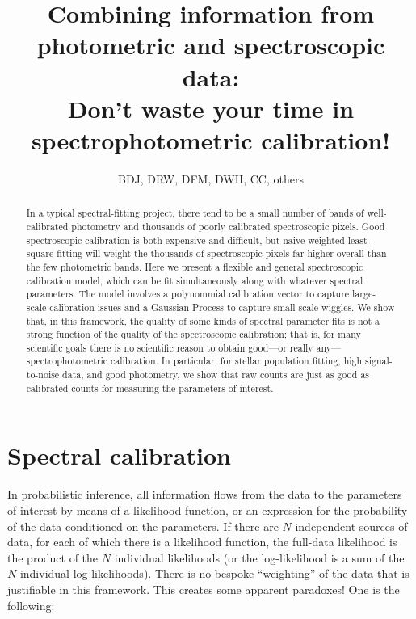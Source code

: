 \documentclass[12pt, letterpaper, preprint]{aastex}
\begin{document}
\title{Combining information from photometric and spectroscopic data:\\
  Don't waste your time in spectrophotometric calibration!}
\author{BDJ, DRW, DFM, DWH, CC, others}

\begin{abstract}
In a typical spectral-fitting project,
  there tend to be a small number of bands of well-calibrated photometry
  and thousands of poorly calibrated spectroscopic pixels.
Good spectroscopic calibration is both expensive and difficult,
  but naive weighted least-square fitting will weight
  the thousands of spectroscopic pixels far higher overall
  than the few photometric bands.
Here we present a flexible and general spectroscopic calibration model,
  which can be fit simultaneously along with whatever spectral parameters.
The model involves a polynommial calibration vector to capture large-scale calibration issues
  and a Gaussian Process to capture small-scale wiggles.
We show that, in this framework, the quality of some kinds of spectral parameter fits
  is not a strong function of the quality of the spectroscopic calibration;
  that is, for many scientific goals there is no scientific reason
  to obtain good---or really any---spectrophotometric calibration.
In particular, for stellar population fitting, high signal-to-noise data,
  and good photometry,
  we show that raw counts are just as good as calibrated counts for measuring the
  parameters of interest.
\end{abstract}


\section{Spectral calibration}

In probabilistic inference, all information flows from the data to the
parameters of interest by means of a likelihood function, or an
expression for the probability of the data conditioned on the
parameters.
If there are $N$ independent sources of data, for each of which there
is a likelihood function, the full-data likelihood is the product of
the $N$ individual likelihoods (or the log-likelihood is a sum of the
$N$ individual log-likelihoods).
There is no bespoke ``weighting'' of the data that is justifiable in
this framework.
This creates some apparent paradoxes!
One is the following:
\end{document}
